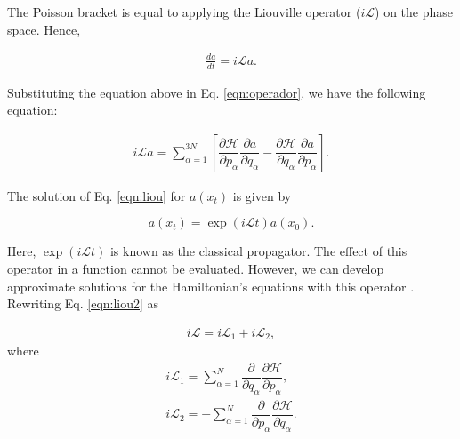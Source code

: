 The Poisson bracket is equal to applying the Liouville operator ($i\mathcal{L}$) on the phase space. Hence,

\begin{equation}
\begin{aligned}
\frac{da}{dt} = i\mathcal{L} a .
\end{aligned}
\label{eqn:liou}
\end{equation}

Substituting the equation above in Eq. \ref{eqn:operador}, we have the following equation:

\begin{equation}
\begin{aligned}
i\mathcal{L} a = \sum_{\alpha=1}^{3N} \left [  \dfrac{\partial \mathcal{H}}{\partial p_{\alpha}}\dfrac{\partial a}{\partial q_{\alpha}}  -  \dfrac{\partial \mathcal{H}}{\partial q_{\alpha}} \dfrac{\partial a}{\partial p_{\alpha}} \right].
\label{eqn:liou2}
\end{aligned}
\end{equation}

The solution of Eq. \ref{eqn:liou} for $a(x_{t})$ is given by

\begin{equation}
a(x_{t}) = \exp (i\mathcal{L}t) a(x_{0}).
\label{eqn:exactsol}
\end{equation}

Here, $\exp (i\mathcal{L}t)$ is known as the classical propagator. The effect of this operator in a function cannot be evaluated. However, we can develop approximate solutions for the Hamiltonian's equations with this operator \cite{tuckerman}. Rewriting Eq. \ref{eqn:liou2} as

\begin{equation}
\begin{aligned}
i\mathcal{L}  =  i\mathcal{L}_{1} + i\mathcal{L}_{2},
\end{aligned}
\end{equation}
where
\begin{equation}
\begin{aligned}
i\mathcal{L}_{1} = \sum_{\alpha=1}^{N}  \dfrac{\partial }{\partial q_{\alpha}} \dfrac{\partial \mathcal{H}}{\partial p_{\alpha}},   \\
i\mathcal{L}_{2} = - \sum_{\alpha=1}^{N} \dfrac{\partial }{\partial p_{\alpha}} \dfrac{\partial \mathcal{H}}{\partial q_{\alpha}} .
\end{aligned}
\end{equation}


